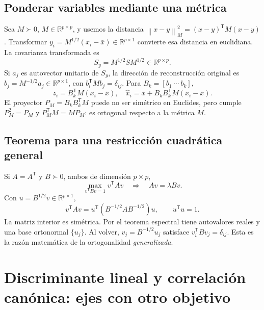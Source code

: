 \documentclass[11pt,a4paper]{article}
\newcommand{\R}{\mathbb R}
\newcommand{\T}{^{\mathsf T}}
\newcommand{\norm}[1]{\left\lVert #1\right\rVert}
\theoremstyle{definition}
\begin{document}
\subsection{Ponderar variables mediante una métrica}
Sea $M\succ0$, $M\in\R^{p\times p}$, y usemos la distancia $\norm{x-y}_M^2=(x-y)\T M(x-y)$. Transformar $y_i=M^{1/2}(x_i-\bar x)\in\R^{p\times1}$ convierte esa distancia en euclidiana. La covarianza transformada es
\[
S_y=M^{1/2}SM^{1/2}\in\R^{p\times p}.
\]
Si $a_j$ es autovector unitario de $S_y$, la dirección de reconstrucción original es $b_j=M^{-1/2}a_j\in\R^{p\times1}$, con $b_i\T Mb_j=\delta_{ij}$. Para $B_k=[b_1\ \cdots\ b_k]$,
\[
z_i=B_k\T M(x_i-\bar x),\quad
\widehat x_i=\bar x+B_kB_k\T M(x_i-\bar x).
\]
El proyector $P_M=B_kB_k\T M$ puede no ser simétrico en Euclides, pero cumple $P_M^2=P_M$ y $P_M\T M=MP_M$: es ortogonal respecto a la métrica $M$.
\subsection{Teorema para una restricción cuadrática general}
Si $A=A\T$ y $B\succ0$, ambos de dimensión $p\times p$,
\[
\max_{v\T Bv=1}v\T Av\quad\Longrightarrow\quad Av=\lambda Bv.
\]
Con $u=B^{1/2}v\in\R^{p\times1}$,
\[
v\T Av=u\T(B^{-1/2}AB^{-1/2})u,\qquad u\T u=1.
\]
La matriz interior es simétrica. Por el teorema espectral tiene autovalores reales y una base ortonormal $\{u_j\}$. Al volver, $v_j=B^{-1/2}u_j$ satisface $v_i\T Bv_j=\delta_{ij}$. Esta es la razón matemática de la ortogonalidad \emph{generalizada}.

\section{Discriminante lineal y correlación canónica: ejes con otro objetivo}
\end{document}
